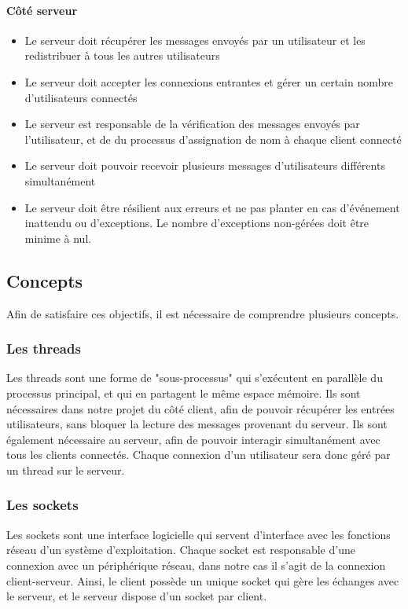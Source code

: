 \documentclass[10pt,a4paper]{article}
\begin{document}
	\paragraph{Côté serveur}
	\begin{itemize}
		\item Le serveur doit récupérer les messages envoyés par un utilisateur et les redistribuer à tous les autres utilisateurs
		\item Le serveur doit accepter les connexions entrantes et gérer un certain nombre d'utilisateurs connectés
		\item Le serveur est responsable de la vérification des messages envoyés par l'utilisateur, et de du processus d'assignation de nom à chaque client connecté
		\item Le serveur doit pouvoir recevoir plusieurs messages d'utilisateurs différents simultanément
		\item Le serveur doit être résilient aux erreurs et ne pas planter en cas d'événement inattendu ou d'exceptions. Le nombre d'exceptions non-gérées doit être minime à nul.
	\end{itemize}

	\subsection{Concepts}
	Afin de satisfaire ces objectifs, il est nécessaire de comprendre plusieurs concepts.\par
	
	\subsubsection{Les threads}
	Les threads sont une forme de "sous-processus" qui s'exécutent en parallèle du processus principal, et qui en partagent le même espace mémoire. Ils sont nécessaires dans notre projet du côté client, afin de pouvoir récupérer les entrées utilisateurs, sans bloquer la lecture des messages provenant du serveur. Ils sont également nécessaire au serveur, afin de pouvoir interagir simultanément avec tous les clients connectés. Chaque connexion d'un utilisateur sera donc géré par un thread sur le serveur.
	
	\subsubsection{Les sockets}
	Les sockets sont une interface logicielle qui servent d'interface avec les fonctions réseau d'un système d'exploitation. Chaque socket est responsable d'une connexion avec un périphérique réseau, dans notre cas il s'agit de la connexion client-serveur. Ainsi, le client possède un unique socket qui gère les échanges avec le serveur, et le serveur dispose d'un socket par client.
	
\end{document}
